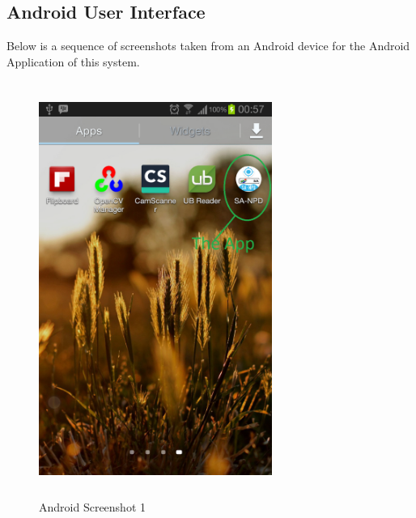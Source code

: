 \documentclass[12pt]{article}
\begin{document}
                    \subsection{Android User Interface}
                    		Below is a sequence of screenshots taken from an Android device for the Android Application of this system.
                    		\begin{figure}[tp]
		                             \centering
		                             \includegraphics[width=3in, height=5.333in]{Pictures/Interface_1.png}
		                             \caption{Android Screenshot 1}
		              		\end{figure}
\end{document}
